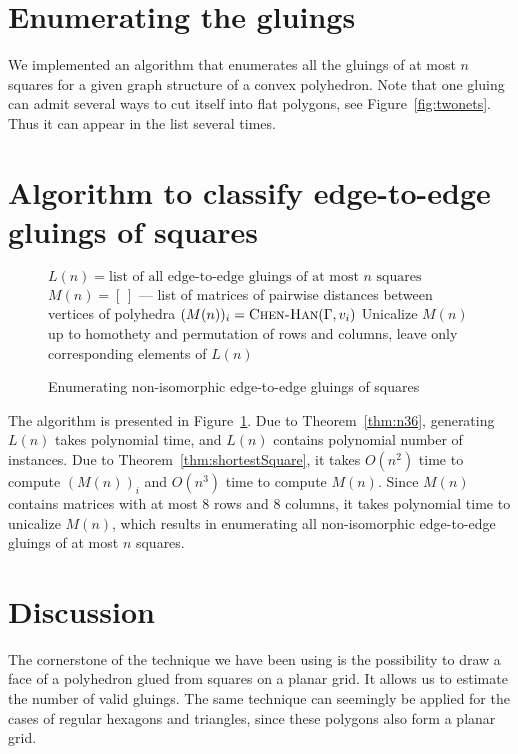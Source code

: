 \documentclass[a4paper,USenglish,cleveref, autoref, thm-restate]{socg-lipics-v2019}
\begin{document}
\section{Enumerating the gluings}

We implemented an algorithm that enumerates all the gluings of at most $n$ squares for a given graph structure of a convex polyhedron. Note that one gluing can admit several ways to cut itself into flat polygons, see Figure~\ref{fig:twonets}. Thus it can appear in the list several times.



\section{Algorithm to classify edge-to-edge gluings of squares}

\begin{figure}[h]
\begin{algorithmic}[1]
	\State $L(n) = \text{list of all edge-to-edge gluings of at most $n$ squares}$
	\State $M(n) = [\,]$ — list of matrices of pairwise distances between vertices of polyhedra
		\State $(M(n))_i = \text{\scshape Chen-Han} (\Gamma,v_i)$
	\EndFor \EndFor
	\State Unicalize $M(n)$ up to homothety and permutation of rows and columns, leave only corresponding elements of $L(n)$
\end{algorithmic}
	\caption{Enumerating non-isomorphic edge-to-edge gluings of squares}
	\label{fig:alglistall}
\end{figure}

The algorithm is presented in Figure~\ref{fig:alglistall}. Due to Theorem~\ref{thm:n36}, generating $L(n)$ takes polynomial time, and $L(n)$ contains polynomial number of instances. Due to Theorem~\ref{thm:shortestSquare}, it takes $O(n^2)$ time to compute $(M(n))_i$ and $O(n^3)$ time to compute $M(n)$. Since $M(n)$ contains matrices with at most 8 rows and 8 columns, it takes polynomial time to unicalize $M(n)$, which results in enumerating all non-isomorphic edge-to-edge gluings of at most $n$ squares.

\section{Discussion}

The cornerstone of the technique we have been using is the possibility to draw a face of a polyhedron glued from squares on a planar grid. It allows us to estimate the number of valid gluings. The same technique can seemingly be applied for the cases of regular hexagons and triangles, since these polygons also form a planar grid.


\end{document}
